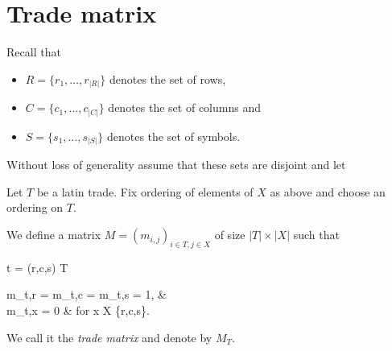 \section{Trade matrix}
Recall that
\begin{itemize}
	\item $R = \{r_1,\dots,r_{|R|}\}$ denotes the set of rows,
	\item $C = \{c_1,\dots,c_{|C|}\}$ denotes the set of columns and
	\item $S = \{s_1,\dots,s_{|S|}\}$ denotes the set of symbols.
\end{itemize}
Without loss of generality assume that these sets are disjoint and let
%

\begin{defn}
Let $T$ be a latin trade. Fix ordering of elements of $X$ as above and choose an ordering on $T$.

We define a matrix $M = (m_{i,j})_{i \in T, j \in X}$ of size $|T| \times |X|$ such that
\begin{cosyeqnarray}
	t = (r,c,s) \in T \Rightarrow
	\begin{cases}
		m_{t,r} = m_{t,c} = m_{t,s} = 1, & \\
		m_{t,x} = 0 & \textrm{ for } x \in X \setminus \{r,c,s\}.
	\end{cases}
\end{cosyeqnarray}%
\end{defn}
We call it the \emph{trade matrix} and denote by $M_T$.


